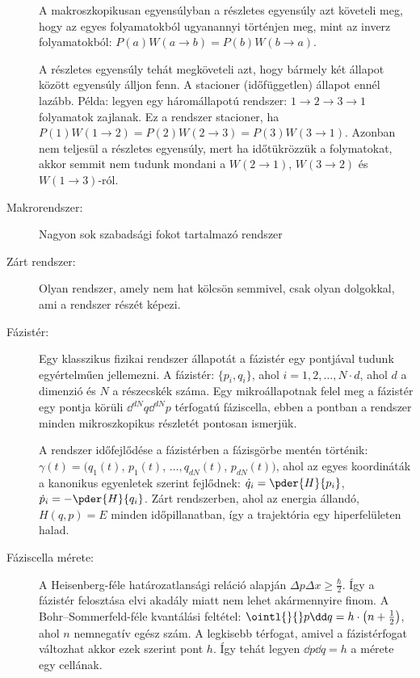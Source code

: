 \begin{description}
    A makroszkopikusan egyensúlyban a részletes egyensúly azt követeli meg, hogy az egyes folyamatokból ugyanannyi történjen meg, mint az inverz folyamatokból: $P(a)W(a\to b)=P(b)W(b\to a)$.
    
    A részletes egyensúly tehát megköveteli azt, hogy bármely két állapot között egyensúly álljon fenn.
   A stacioner (időfüggetlen) állapot ennél lazább.
   Példa: legyen egy háromállapotú rendszer: $1\to 2\to 3\to 1$ folyamatok zajlanak.
   Ez a rendszer stacioner, ha $P(1)W(1\to 2)=P(2)W(2\to 3)=P(3)W(3\to 1)$.
   Azonban nem teljesül a részletes egyensúly, mert ha időtükrözzük a folymatokat, akkor semmit nem tudunk mondani a $W(2\to 1)$, $W(3\to 2)$ és $W(1\to 3)$-ról.
    
   \item[Makrorendszer:]
    
    Nagyon sok szabadsági fokot tartalmazó rendszer
   
   \item[Zárt rendszer:]
    
    Olyan rendszer, amely nem hat kölcsön semmivel, csak olyan dolgokkal, ami a rendszer részét képezi.
    
   \item[Fázistér:]
    
    Egy klasszikus fizikai rendszer állapotát a fázistér egy pontjával tudunk egyértelműen jellemezni.
   A fázistér: $\{p_i,q_i\}$, ahol $i=1,2,\dots,N\cdot d$, ahol $d$ a dimenzió és $N$ a részecskék száma.
   Egy mikroállapotnak felel meg a fázistér egy pontja körüli $\dd^{dN}q\dd^{dN}p$ térfogatú fáziscella, ebben a pontban a rendszer minden mikroszkopikus részletét pontosan ismerjük.
    
    A rendszer időfejlődése a fázistérben a fázisgörbe mentén történik: $\gamma(t)=(q_1(t)$, $p_1(t)$, $\dots,q_{dN}(t)$, $p_{dN}(t))$, ahol az egyes koordináták a kanonikus egyenletek szerint fejlődnek: $\dot{q}_i=\pder{H}{p_i}$, $\dot{p}_i=-\pder{H}{q_i}$.
   Zárt rendszerben, ahol az energia állandó, $H(q,p)=E$ minden időpillanatban, így a trajektória egy hiperfelületen halad.
    
   \item[Fáziscella mérete:]
    
    A Heisenberg-féle határozatlansági reláció alapján $\Delta p\Delta x\ge\frac{\hbar}{2}$. Így a fázistér felosztása elvi akadály miatt nem lehet akármennyire finom.
   A Bohr--Sommerfeld-féle kvantálási feltétel: $\ointl{}{}p\dd q=h\cdot\left(n+\frac{1}{2}\right)$, ahol $n$ nemnegatív egész szám.
   A legkisebb térfogat, amivel a fázistérfogat változhat akkor ezek szerint pont $h$. Így tehát legyen $\dd p\dd q=h$ a mérete egy cellának. 
   

\end{description}
